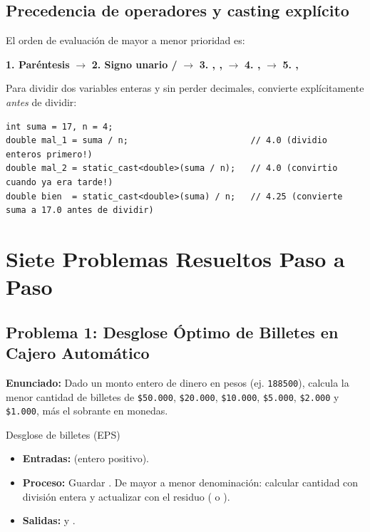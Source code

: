 \documentclass[11pt,letterpaper]{article}
\begin{document}
\subsection{Precedencia de operadores y casting explícito}
El orden de evaluación de mayor a menor prioridad es:
\begin{center}
  \textbf{1. Paréntesis \codigo{()}} $\longrightarrow$ \textbf{2. Signo unario / } $\longrightarrow$ \textbf{3. \codigo{*}, \codigo{/}, \codigo{\%}} $\longrightarrow$ \textbf{4. \codigo{+}, \codigo{-}} $\longrightarrow$ \textbf{5. \codigo{=}, \codigo{+=}}
\end{center}
Para dividir dos variables enteras  y  sin perder decimales, convierte explícitamente \emph{antes} de dividir:
\begin{lstlisting}[style=cppmonitoria, caption={Uso correcto vs. incorrecto de static\_cast}]
int suma = 17, n = 4;
double mal_1 = suma / n;                        // 4.0 (dividio enteros primero!)
double mal_2 = static_cast<double>(suma / n);   // 4.0 (convirtio cuando ya era tarde!)
double bien  = static_cast<double>(suma) / n;   // 4.25 (convierte suma a 17.0 antes de dividir)
\end{lstlisting}

\section{Siete Problemas Resueltos Paso a Paso}

\subsection{Problema 1: Desglose Óptimo de Billetes en Cajero Automático}
\textbf{Enunciado:} Dado un monto entero de dinero en pesos (ej. \texttt{188500}), calcula la menor cantidad de billetes de \texttt{\$50.000}, \texttt{\$20.000}, \texttt{\$10.000}, \texttt{\$5.000}, \texttt{\$2.000} y \texttt{\$1.000}, más el sobrante en monedas.

\begin{analisis}{Desglose de billetes (EPS)}
\begin{itemize}
  \item \textbf{Entradas:}  (entero positivo).
  \item \textbf{Proceso:} Guardar . De mayor a menor denominación: calcular cantidad con división entera y actualizar  con el residuo (\codigo{\%=} o ).
  \item \textbf{Salidas:}  y .
\end{itemize}
\end{analisis}
\end{document}
